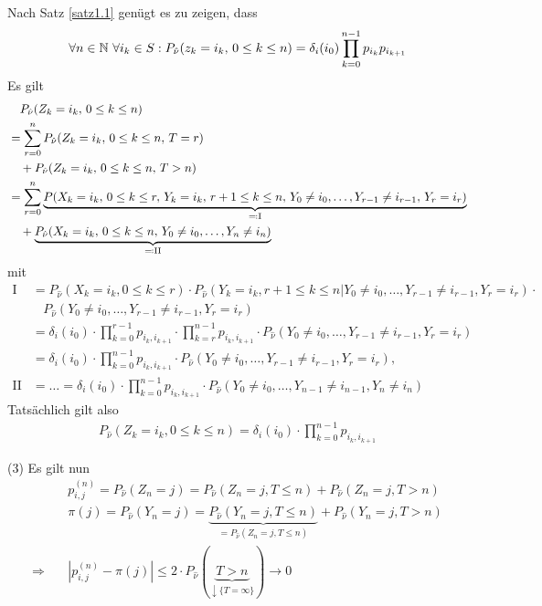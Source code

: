 \documentclass[a4paper,twoside,DIV15,BCOR12mm]{scrbook}
\begin{document}
\begin{beweis}
Nach Satz \ref{satz1.1} genügt es zu zeigen, dass
\[\forall n\in\mathbb{N}\ \forall i_k\in S: P_{\hat\nu}(z_k=i_k,\, 0\le k\le n) = \delta_i(i_0) \prod_{k=0}^{n-1}p_{i_k}p_{i_{k+1}}\]
Es gilt
\begin{align*}
&\quad P_{\hat \nu}(Z_k=i_k,\,0\le k\le n)\\
&= \sum_{r=0}^n P_{\hat \nu}(Z_k=i_k,\, 0\le k\le n,\, T=r)\\
&\quad + P_{\hat \nu}(Z_k = i_k,\, 0\le k \le n,\, T>n) \\
&= \sum_{r=0}^n \underbrace{P(X_k = i_k,\, 0\le k\le r,\, Y_k=i_k,\, r+1\le k\le n,\, Y_0\ne i_0,\ldots, Y_{r-1}\ne i_{r-1},\, Y_r=i_r)}_{\ad \text{I}} \\
&\quad + \underbrace{P_{\hat \nu}(X_k = i_k, \, 0\le k\le n,\, Y_0\ne i_0,\ldots,Y_n\ne i_n)}_{\ad \text{II}}
\end{align*}
mit
\begin{align*}
  \text{I} &= P_{\hat \nu}(X_k = i_k, 0 \leq k \leq r) \cdot P_{\hat \nu}(Y_k = i_k, r+1 \leq k \leq n | Y_0 \neq i_0, \ldots, Y_{r-1} \neq i_{r-1}, Y_r = i_r) \cdot\\
           &~~~~ P_{\hat \nu}(Y_0 \neq i_0, \ldots, Y_{r-1} \neq i_{r-1}, Y_r = i_r)\\
           &= \delta_i(i_0) \cdot \prod_{k=0}^{r-1} p_{i_k,i_{k+1}} \cdot \prod_{k=r}^{n-1} p_{i_k,i_{k+1}} \cdot P_{\hat \nu}(Y_0 \neq i_0, \ldots, Y_{r-1} \neq i_{r-1}, Y_r = i_r)\\
           &= \delta_i(i_0) \cdot \prod_{k=0}^{n-1} p_{i_k,i_{k+1}} \cdot P_{\hat \nu}(Y_0 \neq i_0, \ldots, Y_{r-1} \neq i_{r-1}, Y_r = i_r),\\
  \text{II} &= \ldots = \delta_i(i_0) \cdot \prod_{k=0}^{n-1} p_{i_k,i_{k+1}} \cdot P_{\hat \nu}(Y_0 \neq i_0, \ldots, Y_{n-1} \neq i_{n-1}, Y_n \neq i_n)
\end{align*}
Tatsächlich gilt also
\begin{align*}
  P_{\hat \nu}(Z_k=i_k, 0 \leq k \leq n) = \delta_i(i_0) \cdot \prod_{k=0}^{n-1} p_{i_k,i_{k+1}}
\end{align*}

(3) Es gilt nun
\begin{align*}
    &p_{i,j}^{(n)} = P_{\hat \nu}(Z_n = j) = P_{\hat \nu}(Z_n = j, T \leq n) + P_{\hat \nu}(Z_n = j, T > n)\\
    &\pi(j) = P_{\hat \nu}(Y_n = j) = \underbrace{P_{\hat \nu}(Y_n = j, T \leq n)}_{= P_{\hat \nu}(Z_n = j, T \leq n)} + P_{\hat \nu}(Y_n = j, T > n)\\
  \Rightarrow \quad &|p_{i,j}^{(n)} - \pi(j)| \leq 2 \cdot P_{\hat \nu}(\underbrace{T > n}_{\downarrow \{T = \infty\}}) \longrightarrow 0
\end{align*}
\end{beweis}
\end{document}

